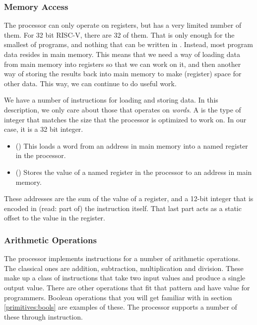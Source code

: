 \subsubsection{Memory Access}

The processor can only operate on registers, but has a very limited number of them. For 32 bit RISC-V, there are 32 of them. That is only enough for the smallest of programs, and nothing that can be written in \csharp. Instead, most program data resides in main memory. This means that we need a way of loading data from main memory into registers so that we can work on it, and then another way of storing the results back into main memory to make (register) space for other data. This way, we can continue to do useful work.

We have a number of instructions for loading and storing data. In this description, we only care about those that operates on \textsl{words}. A  is the type of integer that matches the size that the processor is optimized to work on. In our case, it is a 32 bit integer.
\begin{itemize}
  \item {} () This loads a word from an address in main memory into a named register in the processor.
  \item {} () Stores the value of a named register in the processor to an address in main memory.
\end{itemize}
These addresses are the sum of the value of a register, and a 12-bit integer that is encoded in (read: part of) the instruction itself. That last part acts as a static offset to the value in the register.

\subsubsection{Arithmetic Operations}

The processor implements instructions for a number of arithmetic operations. The classical ones are addition, subtraction, multiplication and division. These make up a class of instructions that take two input values and produce a single output value. There are other operations that fit that pattern and have value for programmers. Boolean operations that you will get familiar with in section \ref{primitives:bools} are examples of these. The processor supports a number of these through instruction.

